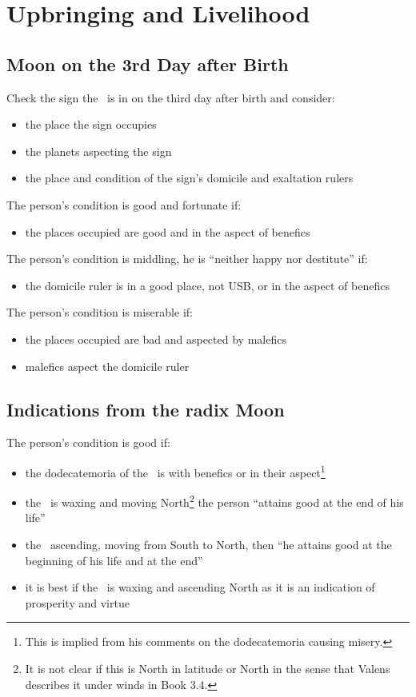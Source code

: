 \section{Upbringing and Livelihood}
\label{sec:upbringing4}
\subsection{Moon on the 3rd Day after Birth}
Check the sign the \Moon\, is in on the third day after birth and consider:
\begin{itemize}[topsep=0em,itemsep=0em]
\item the place the sign occupies
\item the planets aspecting the sign
\item the place and condition of the sign's domicile  and exaltation rulers
\end{itemize}

\noindent The person's condition is good and fortunate if:
\begin{itemize}[topsep=0em,itemsep=0em]
\item the places occupied are good and in the aspect of benefics
\end{itemize}

\noindent The person's condition is middling, he is ``neither happy nor destitute'' if:
\begin{itemize}[topsep=0em,itemsep=0em]
\item the domicile ruler is in a good place, not USB, or in the aspect of benefics
\end{itemize}

\noindent The person's condition is miserable if:
\begin{itemize}[topsep=0em,itemsep=0em]
\item the places occupied are bad and aspected by malefics
\item malefics aspect the domicile ruler
\end{itemize}

\subsection{Indications from the radix Moon}
The person's condition is good if:
\begin{itemize}[topsep=0em,itemsep=0em]
\item the dodecatemoria of the \Moon\, is with benefics or in their aspect\footnote{This is implied from his comments on the dodecatemoria causing misery.}

\item the \Moon\, is waxing and moving North\footnote{It is not clear if this is North in latitude or North in the sense that Valens describes it under winds in Book 3.4.} the person ``attains good at the end of his life''

\item the \Moon\, ascending, moving from South to North, then ``he attains good at the beginning of his life and at the end''

\item it is best if the \Moon\, is waxing and ascending North as it is an indication of prosperity and virtue
\end{itemize}

